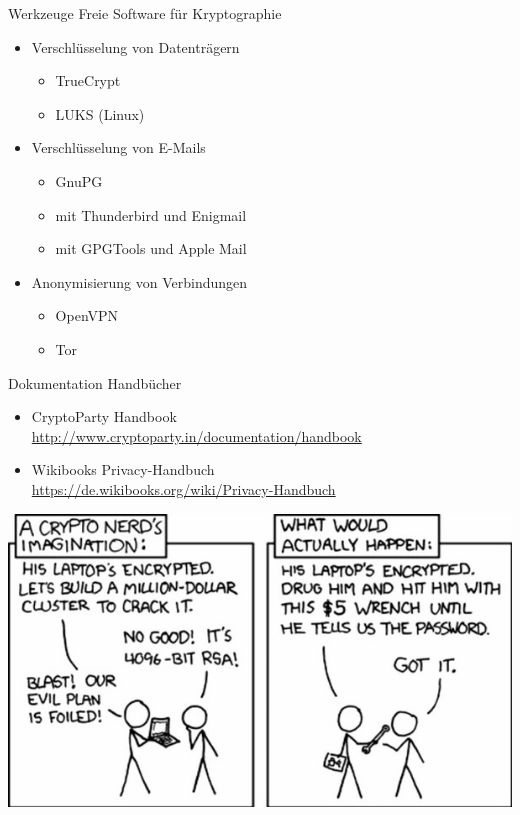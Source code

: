 \documentclass[aspectratio=1610]{beamer}
\begin{document}
  \begin{frame}{Werkzeuge}
    Freie Software für Kryptographie
    \begin{itemize}
      \pause
      \item Verschlüsselung von Datenträgern
      \begin{itemize}
        \pause
        \item TrueCrypt
        \pause
        \item LUKS (Linux)
      \end{itemize}
      \pause
      \item Verschlüsselung von E-Mails
      \begin{itemize}
        \pause
        \item GnuPG
        \pause
        \item mit Thunderbird und Enigmail
        \pause
        \item mit GPGTools und Apple Mail
        \pause
      \end{itemize}
      \pause
      \item Anonymisierung von Verbindungen
      \begin{itemize}
        \pause
        \item OpenVPN
        \pause
        \item Tor
      \end{itemize}
    \end{itemize}
  \end{frame}

  \begin{frame}{Dokumentation}
    Handbücher
    \begin{itemize}
      \pause
      \item CryptoParty Handbook \\ \url{http://www.cryptoparty.in/documentation/handbook}
      \pause
      \item Wikibooks Privacy-Handbuch \\ \url{https://de.wikibooks.org/wiki/Privacy-Handbuch}
    \end{itemize}
  \end{frame}

  \begin{frame}
    \center
    \includegraphics[width=.5\textwidth]{xkcd.jpg}
  \end{frame}
\end{document}
